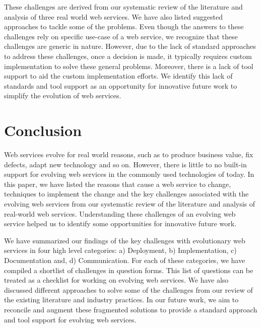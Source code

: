 \documentclass[runningheads,a4paper]{llncs}
\begin{document}
These challenges are derived from our systematic review of the literature and analysis of three real world web services. We have also listed suggested approaches to tackle some of the problems. Even though the answers to these challenges rely on specific use-case of a web service, we recognize that these challenges are generic in nature. However, due to the lack of standard approaches to address these challenges, once a decision is made, it typically requires custom implementation to solve these general problems. Moreover, there is a lack of tool support to aid the custom implementation efforts. We identify this lack of standards and tool support as an opportunity for innovative future work to simplify the evolution of web services.

\section{Conclusion} %
\label{sec:conclusion}
Web services evolve for real world reasons, such as to produce business value, fix defects, adapt new technology and so on. However, there is little to no built-in support for evolving web services in the commonly used technologies of today. In this paper, we have listed the reasons that cause a web service to change, techniques to implement the change and the key challenges associated with the evolving web services from our systematic review of the literature and analysis of real-world web services. Understanding these challenges of an evolving web service helped us to identify some opportunities for innovative future work.

We have summarized our findings of the key challenges with evolutionary web services in four high level categories: a) Deployment, b) Implementation, c) Documentation and, d) Communication. For each of these categories, we have compiled a shortlist of challenges in question forms. This list of questions can be treated as a checklist for working on evolving web services. We have also discussed different approaches to solve some of the challenges from our review of the existing literature and industry practices. In our future work, we aim to reconcile and augment these fragmented solutions to provide a standard approach and tool support for evolving web services.



\end{document}
